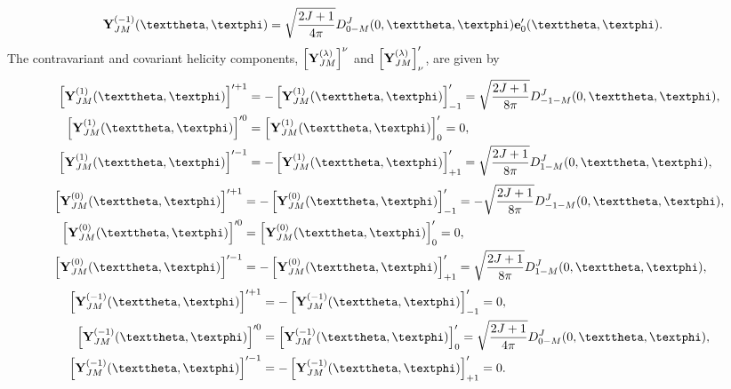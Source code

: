 \begin{enumerate}[label=(\alph*)]
\begin{align}
\vect{Y}_{J M}^{(-1)}(\vartheta, \varphi) & =\sqrt{\frac{2 J+1}{4 \pi}} D_{0-M}^{J}(0, \vartheta, \varphi) \vect{e}_{0}^{\prime}(\vartheta, \varphi). \notag
\end{align}
The contravariant and covariant helicity components, $\left[\mathbf{Y}_{J M}^{(\lambda)}\right]^{\nu}$ and $\left[\mathbf{Y}_{J M}^{(\lambda)}\right]_{\nu}^{\prime}$, are given by
\begin{align}
\left[\vect{Y}_{J M}^{(1)}(\vartheta, \varphi)\right]^{\prime+1}&=-\left[\vect{Y}_{J M}^{(1)}(\vartheta, \varphi)\right]_{-1}^{\prime}=\sqrt{\frac{2 J+1}{8 \pi}} D_{-1-M}^{J}(0, \vartheta, \varphi), \notag\\
\left[\vect{Y}_{J M}^{(1)}(\vartheta, \varphi)\right]^{\prime 0}&=\left[\vect{Y}_{J M}^{(1)}(\vartheta, \varphi)\right]_{0}^{\prime}=0, \label{eq:7:3:36}\\
\left[\vect{Y}_{J M}^{(1)}(\vartheta, \varphi)\right]^{\prime-1}&=-\left[\vect{Y}_{J M}^{(1)}(\vartheta, \varphi)\right]_{+1}^{\prime}=\sqrt{\frac{2 J+1}{8 \pi}} D_{1-M}^{J}(0, \vartheta, \varphi), \notag
\end{align}
\begin{align}
\left[\vect{Y}_{J M}^{(0)}(\vartheta, \varphi)\right]^{\prime+1}&=-\left[\vect{Y}_{J M}^{(0)}(\vartheta, \varphi)\right]_{-1}^{\prime}=-\sqrt{\frac{2 J+1}{8 \pi}} D_{-1-M}^{J}(0, \vartheta, \varphi), \notag\\
\left[\vect{Y}_{J M}^{(0)}(\vartheta, \varphi)\right]^{\prime 0}&=\left[\vect{Y}_{J M}^{(0)}(\vartheta, \varphi)\right]_{0}^{\prime}=0, \label{eq:7:3:37}\\
\left[\vect{Y}_{J M}^{(0)}(\vartheta, \varphi)\right]^{\prime-1}&=-\left[\vect{Y}_{J M}^{(0)}(\vartheta, \varphi)\right]_{+1}^{\prime}=\sqrt{\frac{2 J+1}{8 \pi}} D_{1-M}^{J}(0, \vartheta, \varphi), \notag
\end{align}
\begin{align}
\left[\vect{Y}_{J M}^{(-1)}(\vartheta, \varphi)\right]^{\prime+1}&=-\left[\vect{Y}_{J M}^{(-1)}(\vartheta, \varphi)\right]_{-1}^{\prime}=0, \notag\\
\left[\vect{Y}_{J M}^{(-1)}(\vartheta, \varphi)\right]^{\prime 0}&=\left[\vect{Y}_{J M}^{(-1)}(\vartheta, \varphi)\right]_{0}^{\prime}=\sqrt{\frac{2 J+1}{4 \pi}} D_{0-M}^{J}(0, \vartheta, \varphi), \label{eq:7:3:38}\\
\left[\vect{Y}_{J M}^{(-1)}(\vartheta, \varphi)\right]^{\prime-1}&=-\left[\vect{Y}_{J M}^{(-1)}(\vartheta, \varphi)\right]_{+1}^{\prime}=0. \notag
\end{align}
\end{enumerate}

